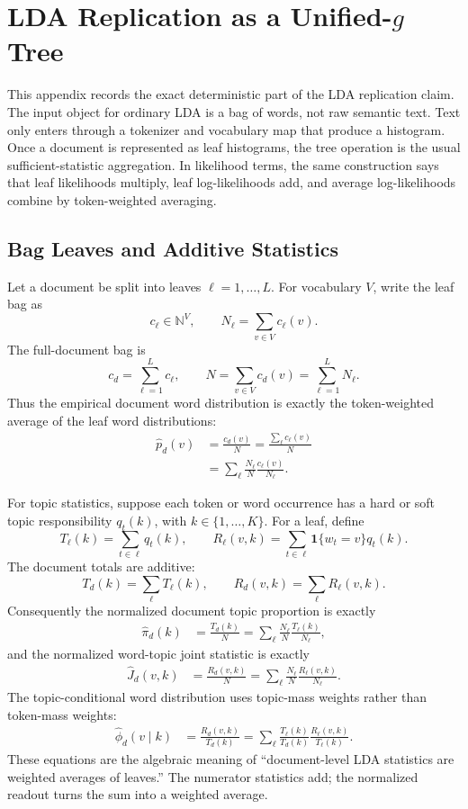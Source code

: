 
\section{LDA Replication as a Unified-\texorpdfstring{$g$}{g} Tree}
\label{app:lda-replication}

This appendix records the exact deterministic part of the LDA replication
claim. The input object for ordinary LDA is a bag of words, not raw semantic
text. Text only enters through a tokenizer and vocabulary map that produce a
histogram. Once a document is represented as leaf histograms, the tree
operation is the usual sufficient-statistic aggregation. In likelihood terms,
the same construction says that leaf likelihoods multiply, leaf
log-likelihoods add, and average log-likelihoods combine by token-weighted
averaging.

\subsection{Bag Leaves and Additive Statistics}

Let a document be split into leaves $\ell=1,\ldots,L$. For vocabulary $V$,
write the leaf bag as
\[
  c_\ell \in \mathbb{N}^{V},
  \qquad
  N_\ell = \sum_{v\in V} c_\ell(v).
\]
The full-document bag is
\[
  c_d = \sum_{\ell=1}^L c_\ell,
  \qquad
  N = \sum_{v\in V} c_d(v) = \sum_{\ell=1}^L N_\ell.
\]
Thus the empirical document word distribution is exactly the token-weighted
average of the leaf word distributions:
\begin{align}
  \hat p_d(v)
  &= \frac{c_d(v)}{N}
   = \frac{\sum_\ell c_\ell(v)}{N} \\
  &= \sum_\ell \frac{N_\ell}{N}\frac{c_\ell(v)}{N_\ell}.
\end{align}

For topic statistics, suppose each token or word occurrence has a hard or soft
topic responsibility $q_t(k)$, with $k\in\{1,\ldots,K\}$. For a leaf, define
\[
  T_\ell(k) = \sum_{t\in \ell} q_t(k),
  \qquad
  R_\ell(v,k) = \sum_{t\in \ell} \mathbf{1}\{w_t=v\}q_t(k).
\]
The document totals are additive:
\[
  T_d(k)=\sum_\ell T_\ell(k),
  \qquad
  R_d(v,k)=\sum_\ell R_\ell(v,k).
\]
Consequently the normalized document topic proportion is exactly
\begin{align}
  \hat\pi_d(k)
  &= \frac{T_d(k)}{N}
   = \sum_\ell \frac{N_\ell}{N}\frac{T_\ell(k)}{N_\ell},
\end{align}
and the normalized word-topic joint statistic is exactly
\begin{align}
  \hat J_d(v,k)
  &= \frac{R_d(v,k)}{N}
   = \sum_\ell \frac{N_\ell}{N}\frac{R_\ell(v,k)}{N_\ell}.
\end{align}
The topic-conditional word distribution uses topic-mass weights rather than
token-mass weights:
\begin{align}
  \hat\phi_d(v\mid k)
  &= \frac{R_d(v,k)}{T_d(k)}
   = \sum_\ell \frac{T_\ell(k)}{T_d(k)}
      \frac{R_\ell(v,k)}{T_\ell(k)}.
\end{align}
These equations are the algebraic meaning of ``document-level LDA statistics
are weighted averages of leaves.'' The numerator statistics add; the normalized
readout turns the sum into a weighted average.


